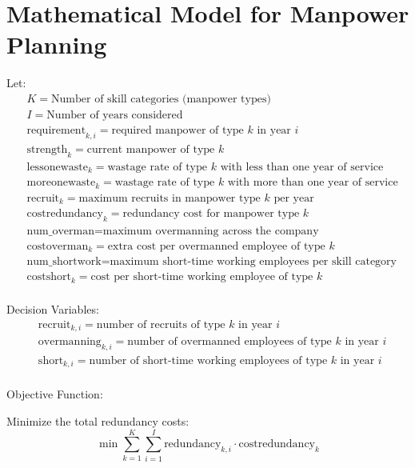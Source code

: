 \documentclass{article}
\begin{document}
\section*{Mathematical Model for Manpower Planning}

Let:
\begin{align*}
    & K = \text{Number of skill categories (manpower types)} \\
    & I = \text{Number of years considered} \\
    & \text{requirement}_{k,i} = \text{required manpower of type } k \text{ in year } i \\
    & \text{strength}_{k} = \text{current manpower of type } k \\
    & \text{lessonewaste}_{k} = \text{wastage rate of type } k \text{ with less than one year of service} \\
    & \text{moreonewaste}_{k} = \text{wastage rate of type } k \text{ with more than one year of service} \\
    & \text{recruit}_{k} = \text{maximum recruits in manpower type } k \text{ per year} \\
    & \text{costredundancy}_{k} = \text{redundancy cost for manpower type } k \\
    & \text{num\_overman} = \text{maximum overmanning across the company} \\
    & \text{costoverman}_{k} = \text{extra cost per overmanned employee of type } k \\
    & \text{num\_shortwork} = \text{maximum short-time working employees per skill category} \\
    & \text{costshort}_{k} = \text{cost per short-time working employee of type } k \\
\end{align*}

Decision Variables:
\begin{align*}
    & \text{recruit}_{k,i} = \text{number of recruits of type } k \text{ in year } i \\
    & \text{overmanning}_{k,i} = \text{number of overmanned employees of type } k \text{ in year } i \\
    & \text{short}_{k,i} = \text{number of short-time working employees of type } k \text{ in year } i \\
\end{align*}

Objective Function:

Minimize the total redundancy costs:
\[
\min \sum_{k=1}^{K} \sum_{i=1}^{I} \text{redundancy}_{k,i} \cdot \text{costredundancy}_{k}
\]
\end{document}
